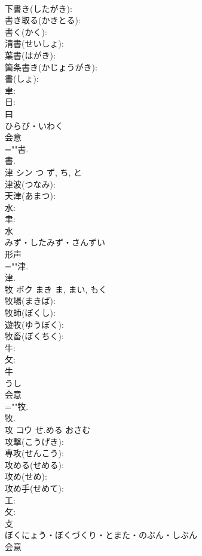 \documentclass[8pt]{extreport}
\begin{document}
\begin{CJK}{UTF8}{min}
\\	下書き(したがき): 
\\	書き取る(かきとる): 
\\	書く(かく): 
\\	清書(せいしょ): 
\\	葉書(はがき): 
\\	箇条書き(かじょうがき): 
\\	書(しょ): 
\\	聿: 
\\	日: 
\\	曰	
\\	ひらび・いわく	
\\	会意 
\\	=""書.
\\	書.
\\	津	シン	つ	ず, ち, と	
\\	津波(つなみ): 
\\	天津(あまつ): 
\\	水: 
\\	聿: 
\\	水	
\\	みず・したみず・さんずい	
\\	形声 
\\	=""津.
\\	津.
\\	牧	ボク	まき	ま, まい, もく	
\\	牧場(まきば): 
\\	牧師(ぼくし): 
\\	遊牧(ゆうぼく): 
\\	牧畜(ぼくちく): 
\\	牛: 
\\	攵: 
\\	牛	
\\	うし	
\\	会意 
\\	=""牧.
\\	牧.
\\	攻	コウ	せ.める	おさむ	
\\	攻撃(こうげき): 
\\	専攻(せんこう): 
\\	攻める(せめる): 
\\	攻め(せめ): 
\\	攻め手(せめて): 
\\	工: 
\\	攵: 
\\	攴	
\\	ぼくにょう・ぼくづくり・とまた・のぶん・しぶん	
\\	会意 

\end{CJK}
\end{document}
